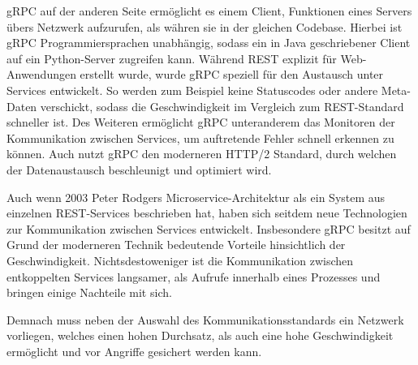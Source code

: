 gRPC auf der anderen Seite ermöglicht es einem Client, Funktionen eines Servers übers Netzwerk aufzurufen, als währen sie in der gleichen Codebase. Hierbei ist gRPC Programmiersprachen unabhängig, sodass ein in Java geschriebener Client auf ein Python-Server zugreifen kann. Während REST explizit für Web-Anwendungen erstellt wurde, wurde gRPC speziell für den Austausch unter Services entwickelt. So werden zum Beispiel keine Statuscodes oder andere Meta-Daten verschickt, sodass die Geschwindigkeit im Vergleich zum REST-Standard schneller ist. Des Weiteren ermöglicht gRPC unteranderem das Monitoren der Kommunikation zwischen Services, um auftretende Fehler schnell erkennen zu können. Auch nutzt gRPC den moderneren HTTP/2 Standard, durch welchen der Datenaustausch beschleunigt und optimiert wird.

Auch wenn 2003 Peter Rodgers Microservice-Architektur als ein System aus einzelnen REST-Services beschrieben hat, haben sich seitdem neue Technologien zur Kommunikation zwischen Services entwickelt. Insbesondere gRPC besitzt auf Grund der moderneren Technik bedeutende Vorteile hinsichtlich der Geschwindigkeit. Nichtsdestoweniger ist die Kommunikation zwischen entkoppelten Services langsamer, als Aufrufe innerhalb eines Prozesses und bringen einige Nachteile mit sich.

Demnach muss neben der Auswahl des Kommunikationsstandards ein Netzwerk vorliegen, welches einen hohen Durchsatz, als auch eine hohe Geschwindigkeit ermöglicht und vor Angriffe gesichert werden kann.
